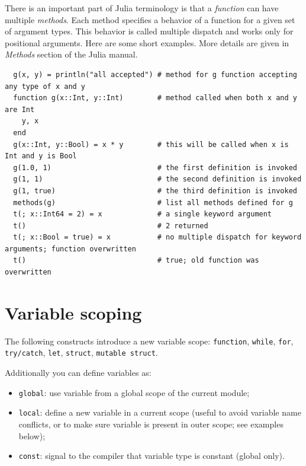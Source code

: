 \documentclass[10pt,a4paper]{article}
\begin{document}
There is an important part of Julia terminology is that a \emph{function} can
have multiple \emph{methods}. Each method specifies a behavior of a function for
a given set of argument types. This behavior is called multiple dispatch and
works only for positional arguments. Here are some short examples. More details
are given in \emph{Methods} section of the Julia manual.
\begin{lstlisting}
  g(x, y) = println("all accepted") # method for g function accepting any type of x and y
  function g(x::Int, y::Int)        # method called when both x and y are Int
    y, x
  end
  g(x::Int, y::Bool) = x * y        # this will be called when x is Int and y is Bool
  g(1.0, 1)                         # the first definition is invoked
  g(1, 1)                           # the second definition is invoked
  g(1, true)                        # the third definition is invoked
  methods(g)                        # list all methods defined for g
  t(; x::Int64 = 2) = x             # a single keyword argument
  t()                               # 2 returned
  t(; x::Bool = true) = x           # no multiple dispatch for keyword arguments; function overwritten
  t()                               # true; old function was overwritten
\end{lstlisting}

\section{Variable scoping}
The following constructs introduce a new variable scope:
\lstinline|function|, \lstinline|while|,
\lstinline|for|, \lstinline|try/catch|,
\lstinline|let|, \lstinline|struct|, \lstinline|mutable struct|.

Additionally you can define variables as:
\begin{itemize}
  \item \lstinline|global|: use variable from a global scope of the current module;
  \item \lstinline|local|: define a new variable in a current scope (useful to avoid variable name conflicts, or to make sure variable is present in outer scope; see examples below);
  \item \lstinline|const|: signal to the compiler that variable type is constant (global only).
\end{itemize}
\end{document}
